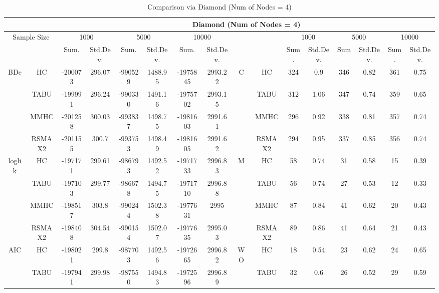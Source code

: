\begin{table}[h]
\centering	\caption{Comparison via Diamond (Num of Nodes = 4)}	\tiny																						
{\tabcolsep=0.01in																										
\begin{tabular}{cc||cc|cc|cc||cc|cc|cc|cc}																										
\hline																										
&	&	\multicolumn{14}{c}{Diamond	(Num	of	Nodes	=	4)}\tabularnewline																			
\hline																										
\multicolumn{2}{c||}{Sample	Size}	&	\multicolumn{2}{c|}{1000}	&	\multicolumn{2}{c|}{5000}	&	\multicolumn{2}{c||}{10000}	&	&	&	\multicolumn{2}{c|}{1000}	&	\multicolumn{2}{c|}{5000}	&	\multicolumn{2}{c}{10000}\tabularnewline											
\hline																										
&	&	Sum.	&	Std.Dev.	&	Sum.	&	Std.Dev.	&	Sum.	&	Std.Dev.	&	&	&	Sum.	&	Std.Dev.	&	Sum.	&	Std.Dev.	&	Sum.	&	Std.Dev.\tabularnewline
\hline																										
\hline																										
\multirow{4}{*}{BDe} & HC &	-200073 & 	296.07 & 	-990529 & 	1488.95 & 	-1975845 & 	2993.22 & 	\multirow{4}{*}{C} & HC &	324 & 	0.9 & 	346 & 	0.82 & 	361 & 	0.75\tabularnewline													
& TABU &	-199991 & 	296.24 & 	-990330 & 	1491.16 & 	-1975702 & 	2993.15 & 	& TABU &	312 & 	1.06 & 	347 & 	0.74 & 	359 & 	0.65\tabularnewline													
& MMHC &	-201258 & 	300.03 & 	-993837 & 	1498.75 & 	-1981603 & 	2991.61 & 	& MMHC &	296 & 	0.92 & 	338 & 	0.81 & 	357 & 	0.74\tabularnewline													
& RSMAX2 &	-201155 & 	300.7 & 	-993753 & 	1498.49 & 	-1981605 & 	2991.62 & 	& RSMAX2 &	294 & 	0.95 & 	337 & 	0.85 & 	356 & 	0.74\tabularnewline													
\hline																										
\multirow{4}{*}{loglik} & HC &	-197171 & 	299.61 & 	-986793 & 	1492.52 & 	-1971733 & 	2996.83 & 	\multirow{4}{*}{M} & HC &	58 & 	0.74 & 	31 & 	0.58 & 	15 & 	0.39\tabularnewline													
& TABU &	-197103 & 	299.77 & 	-986678 & 	1494.75 & 	-1971710 & 	2996.88 & 	& TABU &	56 & 	0.74 & 	27 & 	0.53 & 	12 & 	0.33\tabularnewline													
& MMHC &	-198517 & 	303.8 & 	-990244 & 	1502.38 & 	-1977631 & 	2995 & 	& MMHC &	87 & 	0.84 & 	41 & 	0.62 & 	20 & 	0.43\tabularnewline													
& RSMAX2 &	-198408 & 	304.54 & 	-990154 & 	1502.07 & 	-1977635 & 	2995.03 & 	& RSMAX2 &	89 & 	0.86 & 	41 & 	0.64 & 	21 & 	0.43\tabularnewline													
\hline																										
\multirow{4}{*}{AIC} & HC &	-198021 & 	299.8 & 	-987703 & 	1492.56 & 	-1972665 & 	2996.82 & 	\multirow{4}{*}{WO} & HC &	18 & 	0.54 & 	23 & 	0.62 & 	24 & 	0.65\tabularnewline													
& TABU &	-197941 & 	299.98 & 	-987550 & 	1494.83 & 	-1972596 & 	2996.89 & 	& TABU &	32 & 	0.6 & 	26 & 	0.52 & 	29 & 	0.59\tabularnewline													

\end{tabular}}
\end{table}
